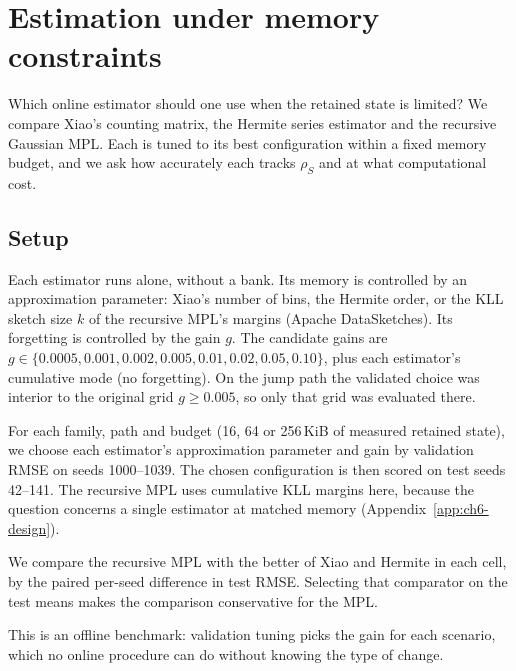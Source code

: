 \section{Estimation under memory constraints}\label{sec:ch6-e1}

Which online estimator should one use when the retained state is limited?
We compare Xiao's counting matrix, the Hermite series estimator and the recursive Gaussian MPL.
Each is tuned to its best configuration within a fixed memory budget, and we ask how accurately each tracks $\rho_S$ and at what computational cost.

\subsection{Setup}

Each estimator runs alone, without a bank.
Its memory is controlled by an approximation parameter: Xiao's number of bins, the Hermite order, or the KLL sketch size $k$ of the recursive MPL's margins (Apache DataSketches).
Its forgetting is controlled by the gain $g$.
The candidate gains are $g \in \{0.0005, 0.001, 0.002, 0.005, 0.01, 0.02, 0.05, 0.10\}$, plus each estimator's cumulative mode (no forgetting).
On the jump path the validated choice was interior to the original grid $g \ge 0.005$, so only that grid was evaluated there.

For each family, path and budget (16, 64 or 256\,KiB of measured retained state), we choose each estimator's approximation parameter and gain by validation RMSE on seeds 1000--1039.
The chosen configuration is then scored on test seeds 42--141.
The recursive MPL uses cumulative KLL margins here, because the question concerns a single estimator at matched memory (Appendix~\ref{app:ch6-design}).

We compare the recursive MPL with the better of Xiao and Hermite in each cell, by the paired per-seed difference in test RMSE.
Selecting that comparator on the test means makes the comparison conservative for the MPL.

This is an offline benchmark: validation tuning picks the gain for each scenario, which no online procedure can do without knowing the type of change.

